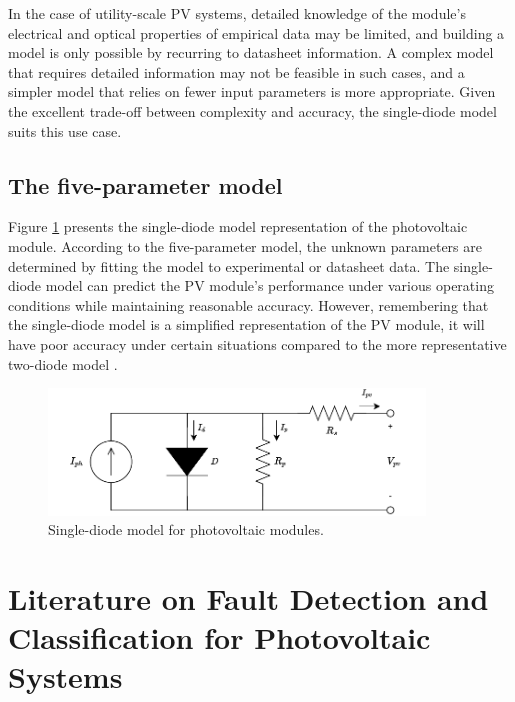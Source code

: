 In the case of utility-scale PV systems, detailed knowledge of the module's electrical and optical properties of empirical data may be limited, and building a model is only possible by recurring to datasheet information. A complex model that requires detailed information may not be feasible in such cases, and a simpler model that relies on fewer input parameters is more appropriate. Given the excellent trade-off between complexity and accuracy, the single-diode model suits this use case.

\subsection{The five-parameter model}

Figure \ref{fig:onediodedraw} presents the single-diode model representation of the photovoltaic module. According to the five-parameter model, the unknown parameters are determined by fitting the model to experimental or datasheet data. The single-diode model can predict the PV module's performance under various operating conditions while maintaining reasonable accuracy. However, remembering that the single-diode model is a simplified representation of the PV module, it will have poor accuracy under certain situations compared to the more representative two-diode model \cite{Godina2017}.

\begin{figure}[H]
    \centering
    \includegraphics[width=10cm]{figures/chapter2/onediode.drawio.pdf} \caption{Single-diode model for photovoltaic modules.}
    \label{fig:onediodedraw}
\end{figure}


\section{Literature on Fault Detection and Classification for Photovoltaic Systems}

